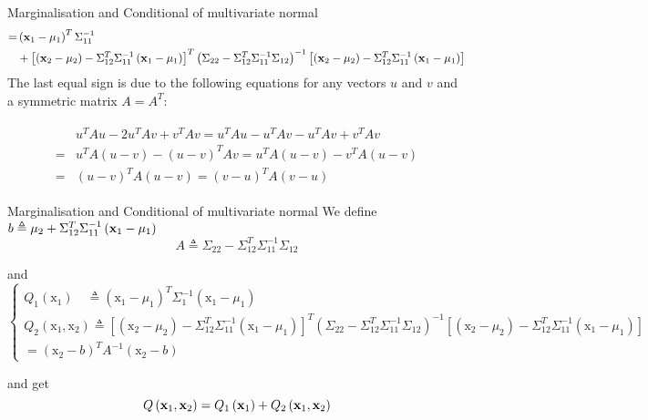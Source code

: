 \documentclass{beamer}
\begin{document}
\begin{frame}{Marginalisation and Conditional of multivariate normal}
	\begin{gather}
	\begin{aligned}
	=&\left(\mathbf{x}_{1}-\mu_{1}\right)^{T} \Sigma_{11}^{-1}\\
	&+\left[\left(\mathbf{x}_{2}-\mu_{2}\right)-\Sigma_{12}^{T} \Sigma_{11}^{-1}\left(\mathbf{x}_{1}-\mu_{1}\right)\right]^{T}\left(\Sigma_{22}-\Sigma_{12}^{T} \Sigma_{11}^{-1} \Sigma_{12}\right)^{-1}\left[\left(\mathbf{x}_{2}-\mu_{2}\right)-\Sigma_{12}^{T} \Sigma_{11}^{-1}\left(\mathbf{x}_{1}-\mu_{1}\right)\right]
	\end{aligned}
	\end{gather}
	The last equal sign is due to the following equations for any vectors $u$ and $v$ and a symmetric matrix $A=A^T$:
	
	\begin{gather}
	\begin{aligned}
	& u^{T} A u-2 u^{T} A v+v^{T} A v=u^{T} A u-u^{T} A v-u^{T} A v+v^{T} A v \\
	=& u^{T} A(u-v)-(u-v)^{T} A v=u^{T} A(u-v)-v^{T} A(u-v) \\
	=&(u-v)^{T} A(u-v)=(v-u)^{T} A(v-u)
	\end{aligned} 
	\end{gather}
\end{frame}

\begin{frame}{Marginalisation and Conditional of multivariate normal}
	We define  
	$b \triangleq \mu_{2}+\Sigma_{12}^{T} \Sigma_{11}^{-1}\left(\mathbf{x}_{1}-\mu_{1}\right)$
	\[
	A \triangleq \Sigma_{22}-\Sigma_{12}^{T} \Sigma_{11}^{-1} \Sigma_{12}
	\]
	
	and 
	$$\left\{\begin{array}{l}{Q_{1}\left(\mathrm{x}_{1}\right) \quad \triangleq\left(\mathrm{x}_{1}-\mu_{1}\right)^{T} \Sigma_{1}^{-1}\left(\mathrm{x}_{1}-\mu_{1}\right)} \\ {Q_{2}\left(\mathrm{x}_{1}, \mathrm{x}_{2}\right) \triangleq\left[\left(\mathrm{x}_{2}-\mu_{2}\right)-\Sigma_{12}^{T} \Sigma_{11}^{-1}\left(\mathrm{x}_{1}-\mu_{1}\right)\right]^{T}\left(\Sigma_{22}-\Sigma_{12}^{T} \Sigma_{11}^{-1} \Sigma_{12}\right)^{-1}\left[\left(\mathrm{x}_{2}-\mu_{2}\right)-\Sigma_{12}^{T} \Sigma_{11}^{-1}\left(\mathrm{x}_{1}-\mu_{1}\right)\right]} \\ {=\left(\mathrm{x}_{2}-b\right)^{T} A^{-1}\left(\mathrm{x}_{2}-b\right)}\end{array}\right.$$
	
	and get 
	$$Q\left(\mathbf{x}_{1}, \mathbf{x}_{2}\right)=Q_{1}\left(\mathbf{x}_{1}\right)+Q_{2}\left(\mathbf{x}_{1}, \mathbf{x}_{2}\right)$$
\end{frame}
\end{document}
